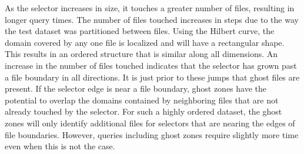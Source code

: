 \documentclass[apjl]{emulateapj}
\begin{document}
As the selector increases in size, it touches a greater number of files, resulting in longer query times. The number of files touched increases in steps due to the way the test dataset was partitioned between files. Using the Hilbert curve, the domain covered by any one file is localized and will have a rectangular shape. This results in an ordered structure that is similar along all dimensions. An increase in the number of files touched indicates that the selector has grown past a file boundary in all directions. It is just prior to these jumps that ghost files are present. If the selector edge is near a file boundary, ghost zones have the potential to overlap the domains contained by neighboring files that are not already touched by the selector. For such a highly ordered dataset, the ghost zones will only identify additional files for selectors that are nearing the edges of file boundaries. However, queries including ghost zones require slightly more time even when this is not the case.

\end{document}
